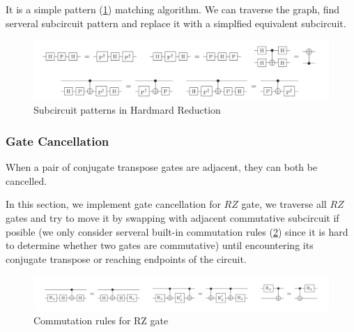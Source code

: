     It is a simple pattern (\ref{pattern}) matching algorithm. We can traverse the graph, find serveral subcircuit pattern and replace it with a simplfied equivalent subcircuit.


    \begin{center}
        \begin{figure}
            \label{pattern}
            \centering
            \includegraphics[width=0.9\linewidth]{images/hardmard_reduction.png}
            \caption{Subcircuit patterns in Hardmard Reduction}
        \end{figure}
    \end{center}

    \subsubsection{Gate Cancellation}
    When a pair of conjugate transpose gates are adjacent, they can both be cancelled.

    In this section, we implement gate cancellation for $RZ$ gate, we traverse all $RZ$ gates and try to move it by swapping with adjacent commutative subcircuit if posible (we only consider serveral  built-in commutation rules (\ref{commutation}) since it is hard to determine whether two gates are commutative) until encountering its conjugate transpose or reaching endpoints of the circuit.

\begin{center}
    \begin{figure}
        \label{commutation}
        \centering
        \includegraphics[width=0.9\linewidth]{images/gate_cancellation.png}
        \caption{Commutation rules for RZ gate}
    \end{figure}
\end{center}

